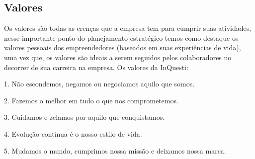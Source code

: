 \subsection{Valores}
Os valores são todas as crenças que a empresa tem para cumprir suas atividades, nesse importante ponto do planejamento estratégico temos como destaque os valores pessoais dos empreendedores (baseados em suas experiências de vida), uma vez que, os valores são ideais a serem seguidos pelos colaboradores no decorrer de sua carreira na empresa.
Os valores da InQuesti: 

1. Não escondemos, negamos ou negociamos aquilo que somos.

2. Fazemos o melhor em tudo o que nos comprometemos.

3. Cuidamos e zelamos por aquilo que conquistamos.

4. Evolução contínua é o nosso estilo de vida.

5. Mudamos o mundo, cumprimos nossa missão e deixamos nossa marca.